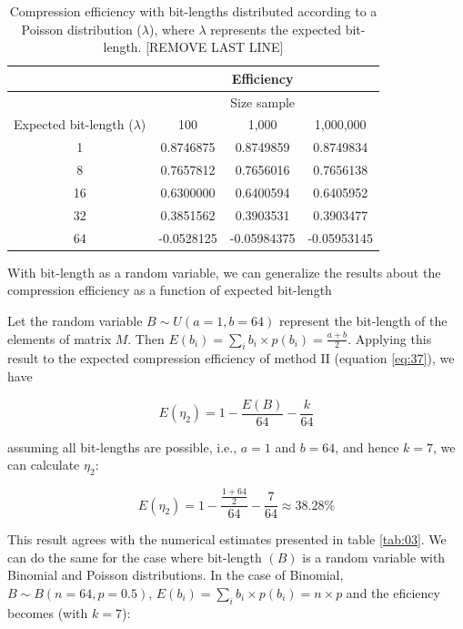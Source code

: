 \documentclass[10pt]{article}
\begin{document}
\begin{table}[h]
  \centering
  \caption{Compression efficiency with bit-lengths distributed according to a Poisson distribution ($\lambda$), where $\lambda$ represents the expected bit-length. [REMOVE LAST LINE]}
 \begin{tabular}{cccc}
    \hline
			& 	&Efficiency         & \\
    \hline
			&  	&Size sample& \\
    Expected bit-length ($\lambda$)		& 100	& 1,000		    & 1,000,000 \\
    \hline
     1	& 0.8746875 & 0.8749859   & 0.8749834 \\
     8 	& 0.7657812 & 0.7656016   & 0.7656138 \\
     16	& 0.6300000 & 0.6400594   & 0.6405952 \\
     32	& 0.3851562 & 0.3903531   & 0.3903477 \\
     64	& -0.0528125& -0.05984375 & -0.05953145 \\
    \hline
 \end{tabular}
 \label{tab:05}
\end{table}

With bit-length as a random variable, we can generalize the results about the compression efficiency as a function of expected bit-length

Let the random variable $B \sim U(a=1,b=64)$ represent the  bit-length of the elements of matrix $M$. Then $E(b_i) = \sum_{i} b_i \times p(b_i) = \frac{a+b}{2}$.  Applying this result to the expected compression efficiency of method II (equation \ref{eq:37}), we have 

\begin{equation}\label{eq:44}
 E(\eta_2) = 1 - \frac{E(B)}{64} - \frac{k}{64} 
\end{equation}

assuming all bit-lengths are possible, i.e., $a=1$ and $b=64$, and hence $k=7$, we can calculate $\eta_2$:

\begin{equation}\label{eq:45}
 E(\eta_2) = 1 - \frac{\frac{1+64}{2}}{64} - \frac{7}{64} \approx 38.28\% 
\end{equation}

This result agrees with the numerical estimates presented in table \ref{tab:03}. We can do the same for the case where bit-length $(B)$ is a random variable with Binomial and Poisson distributions. In the case of Binomial, $B \sim B(n=64,p=0.5)$, $E(b_i) = \sum_{i} b_i \times p(b_i) = n \times p$ and the eficiency becomes (with $k=7$):
\end{document}
